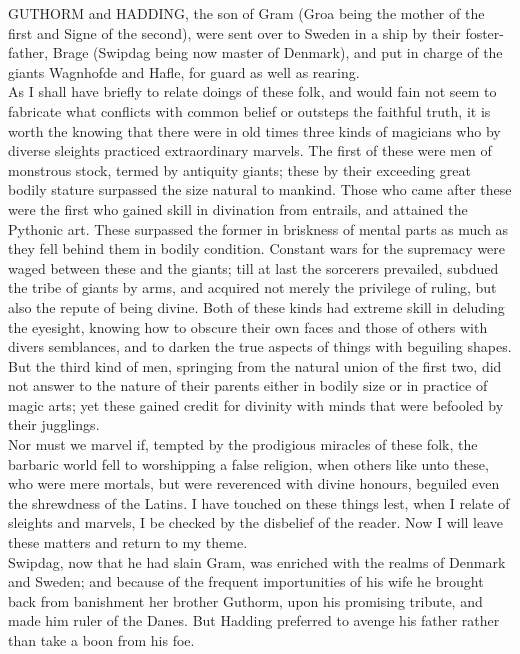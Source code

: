 \documentclass[10pt,a4paper]{report}
\begin{document}
GUTHORM and HADDING, the son of Gram (Groa being the mother of the first and Signe of the second), were sent over to Sweden in a ship by their foster-father, Brage (Swipdag being now master of Denmark), and put in charge of the giants Wagnhofde and Hafle, for guard as well as rearing.\\

As I shall have briefly to relate doings of these folk, and would fain not seem to fabricate what conflicts with common belief or outsteps the faithful truth, it is worth the knowing that there were in old times three kinds of magicians who by diverse sleights practiced extraordinary marvels. The first of these were men of monstrous stock, termed by antiquity giants; these by their exceeding great bodily stature surpassed the size natural to mankind. Those who came after these were the first who gained skill in divination from entrails, and attained the Pythonic art. These surpassed the former in briskness of mental parts as much as they fell behind them in bodily condition. Constant wars for the supremacy were waged between these and the giants; till at last the sorcerers prevailed, subdued the tribe of giants by arms, and acquired not merely the privilege of ruling, but also the repute of being divine. Both of these kinds had extreme skill in deluding the eyesight, knowing how to obscure their own faces and those of others with divers semblances, and to darken the true aspects of things with beguiling shapes. But the third kind of men, springing from the natural union of the first two, did not answer to the nature of their parents either in bodily size or in practice of magic arts; yet these gained credit for divinity with minds that were befooled by their jugglings.\\

Nor must we marvel if, tempted by the prodigious miracles of these folk, the barbaric world fell to worshipping a false religion, when others like unto these, who were mere mortals, but were reverenced with divine honours, beguiled even the shrewdness of the Latins. I have touched on these things lest, when I relate of sleights and marvels, I be checked by the disbelief of the reader. Now I will leave these matters and return to my theme.\\

Swipdag, now that he had slain Gram, was enriched with the realms of Denmark and Sweden; and because of the frequent importunities of his wife he brought back from banishment her brother Guthorm, upon his promising tribute, and made him ruler of the Danes. But Hadding preferred to avenge his father rather than take a boon from his foe.\\
\end{document}
